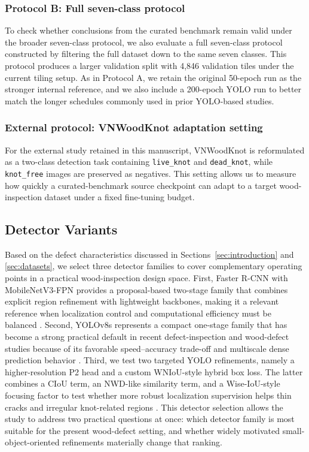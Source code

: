 \documentclass[10pt,a4paper]{article}
\begin{document}
\subsubsection{Protocol B: Full seven-class protocol}
To check whether conclusions from the curated benchmark remain valid under the broader seven-class protocol, we also evaluate a full seven-class protocol constructed by filtering the full dataset down to the same seven classes. This protocol produces a larger validation split with 4,846 validation tiles under the current tiling setup. As in Protocol A, we retain the original 50-epoch run as the stronger internal reference, and we also include a 200-epoch YOLO run to better match the longer schedules commonly used in prior YOLO-based studies.

\subsubsection{External protocol: VNWoodKnot adaptation setting}
For the external study retained in this manuscript, VNWoodKnot is reformulated as a two-class detection task containing \texttt{live\_knot} and \texttt{dead\_knot}, while \texttt{knot\_free} images are preserved as negatives. This setting allows us to measure how quickly a curated-benchmark source checkpoint can adapt to a target wood-inspection dataset under a fixed fine-tuning budget.



\subsection{Detector Variants}
\label{sec:detectors}

Based on the defect characteristics discussed in Sections~\ref{sec:introduction} and \ref{sec:datasets}, we select three detector families to cover complementary operating points in a practical wood-inspection design space. First, Faster R-CNN with MobileNetV3-FPN provides a proposal-based two-stage family that combines explicit region refinement with lightweight backbones, making it a relevant reference when localization control and computational efficiency must be balanced \citep{faster_rcnn,mobilenetv3,mittal_2024}. Second, YOLOv8s represents a compact one-stage family that has become a strong practical default in recent defect-inspection and wood-defect studies because of its favorable speed--accuracy trade-off and multiscale dense prediction behavior \citep{odca_yolo,bpn_yolo,sim_yolo,fdd_yolo}. Third, we test two targeted YOLO refinements, namely a higher-resolution P2 head and a custom WNIoU-style hybrid box loss. The latter combines a CIoU term, an NWD-like similarity term, and a Wise-IoU-style focusing factor to test whether more robust localization supervision helps thin cracks and irregular knot-related regions \citep{tong_2023_wiseiou,wang_2021_nwd,zheng_2020_diou}. This detector selection allows the study to address two practical questions at once: which detector family is most suitable for the present wood-defect setting, and whether widely motivated small-object-oriented refinements materially change that ranking.
\end{document}
